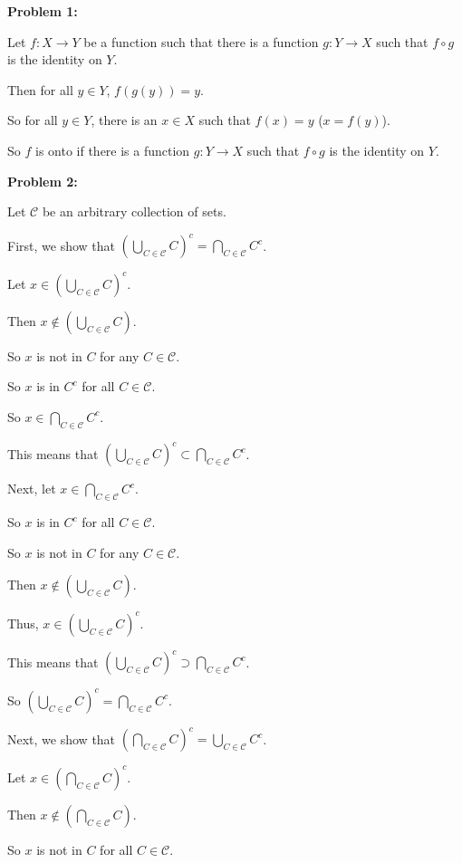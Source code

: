 \documentclass[a4paper,12pt]{article}
\newcommand{\tab}{\hspace{4mm}} %
\newcommand{\shunt}{\vspace{20mm}}
\newcommand{\scrC}{\mathcal{C}}
\begin{document}
{\bf Problem 1:}

Let $f: X \to Y$ be a function such that there is a function $g: Y \to X$ such that $f \circ g$ is the identity on $Y$.

Then for all $y \in Y$, $f(g(y)) = y$.

So for all $y \in Y$, there is an $x \in X$ such that $f(x) = y$ ($x = f(y)$).

So $f$ is onto if there is a function $g: Y \to X$ such that $f \circ g$ is the identity on $Y$.

\shunt

{\bf Problem 2:}

Let $\scrC$ be an arbitrary collection of sets.

First, we show that $(\bigcup\limits_{C \in \scrC} C)^c = \bigcap\limits_{C \in \scrC} C^c$.

Let $x \in (\bigcup\limits_{C \in \scrC} C)^c$.

\tab Then $x \notin (\bigcup\limits_{C \in \scrC} C)$.

\tab So $x$ is not in $C$ for any $C \in \scrC$.

\tab So $x$ is in $C^c$ for all $C \in \scrC$.

\tab So $x \in \bigcap\limits_{C \in \scrC} C^c$.

This means that $(\bigcup\limits_{C \in \scrC} C)^c \subset \bigcap\limits_{C \in \scrC} C^c$.

Next, let $x \in \bigcap\limits_{C \in \scrC} C^c$.

\tab So $x$ is in $C^c$ for all $C \in \scrC$.

\tab So $x$ is not in $C$ for any $C \in \scrC$.

\tab Then $x \notin (\bigcup\limits_{C \in \scrC} C)$.

\tab Thus, $x \in (\bigcup\limits_{C \in \scrC} C)^c$.

This means that $(\bigcup\limits_{C \in \scrC} C)^c \supset \bigcap\limits_{C \in \scrC} C^c$.

So $(\bigcup\limits_{C \in \scrC} C)^c = \bigcap\limits_{C \in \scrC} C^c$.

Next, we show that $(\bigcap\limits_{C \in \scrC} C)^c = \bigcup\limits_{C \in \scrC} C^c$.

Let $x \in (\bigcap\limits_{C \in \scrC} C)^c$.

\tab Then $x \notin (\bigcap\limits_{C \in \scrC} C)$.

\tab So $x$ is not in $C$ for all $C \in \scrC$.
\end{document}
